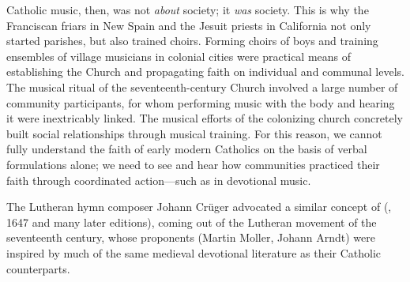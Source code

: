 Catholic music, then, was not \emph{about} society; it \emph{was} society.
This is why the Franciscan friars in New Spain and the Jesuit priests in
California not only started parishes, but also trained choirs.
Forming choirs of boys and training ensembles of village musicians in colonial
cities were practical means of establishing the Church and propagating faith on
individual and communal levels.
The musical ritual of the seventeenth-century Church involved a large number of
community participants, for whom performing music with the body and hearing it
were inextricably linked.
The musical efforts of the colonizing church concretely built social
relationships through musical training.%
    \Autocite{RamosKittrell:PlayingCathedral}
For this reason, we cannot fully understand the faith of early modern Catholics
on the basis of verbal formulations alone; we need to see and hear how
communities practiced their faith through coordinated action---such as in
devotional music.%
\begin{Footnote}
    The Lutheran hymn composer Johann Crüger advocated a similar concept of
     (,
    1647 and many later editions), coming out of the Lutheran 
    movement of the seventeenth century, whose proponents (Martin Moller, Johann
    Arndt) were inspired by much of the same medieval devotional literature as
    their Catholic counterparts.
\end{Footnote}


\endinput
